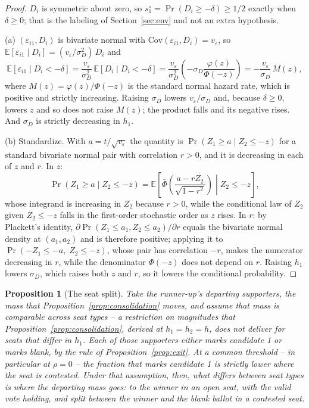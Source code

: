 \documentclass[11pt]{article}
\newtheorem{proposition}{Proposition}
\theoremstyle{definition}
\theoremstyle{remark}
\begin{document}
\begin{proof}
$D_i$ is symmetric about zero, so $s^\circ_1 = \Pr(D_i \ge -\delta) \ge 1/2$
exactly when $\delta \ge 0$; that is the labeling of Section~\ref{sec:env} and
not an extra hypothesis.

(a) $(\varepsilon_{i1}, D_i)$ is bivariate normal with
$\mathrm{Cov}(\varepsilon_{i1}, D_i) = v_\varepsilon$, so
$\mathbb{E}[\varepsilon_{i1} \mid D_i] = (v_\varepsilon/\sigma_D^2)\,D_i$ and
\[
  \mathbb{E}[\varepsilon_{i1} \mid D_i < -\delta]
  = \frac{v_\varepsilon}{\sigma_D^2}\,
    \mathbb{E}[D_i \mid D_i < -\delta]
  = \frac{v_\varepsilon}{\sigma_D^2}
    \left(-\sigma_D\frac{\varphi(z)}{\Phi(-z)}\right)
  = -\frac{v_\varepsilon}{\sigma_D}\,M(z),
\]
where $M(z) = \varphi(z)/\Phi(-z)$ is the standard normal hazard rate, which
is positive and strictly increasing. Raising $\sigma_D$ lowers
$v_\varepsilon/\sigma_D$ and, because $\delta \ge 0$, lowers $z$ and so does
not raise $M(z)$; the product falls and its negative rises. And $\sigma_D$ is
strictly decreasing in $h_1$.

(b) Standardize. With $a = t/\sqrt{v_\varepsilon}$ the quantity is
$\Pr(Z_1 \ge a \mid Z_2 \le -z)$ for a standard bivariate normal pair with
correlation $r > 0$, and it is decreasing in each of $z$ and $r$. In $z$:
\[
  \Pr(Z_1 \ge a \mid Z_2 \le -z)
  = \mathbb{E}\left[\left.\bar\Phi\!\left(\frac{a - rZ_2}{\sqrt{1-r^2}}\right)
    \;\right|\; Z_2 \le -z\right],
\]
whose integrand is increasing in $Z_2$ because $r > 0$, while the conditional
law of $Z_2$ given $Z_2 \le -z$ falls in the first-order stochastic order as
$z$ rises. In $r$: by Plackett's identity,
$\partial\Pr(Z_1 \le a_1, Z_2 \le a_2)/\partial r$ equals the bivariate normal
density at $(a_1,a_2)$ and is therefore positive; applying it to
$\Pr(-Z_1 \le -a,\; Z_2 \le -z)$, whose pair has correlation $-r$, makes the
numerator decreasing in $r$, while the denominator $\Phi(-z)$ does not depend
on $r$. Raising $h_1$ lowers $\sigma_D$, which raises both $z$ and $r$, so it
lowers the conditional probability.
\end{proof}

\begin{proposition}[The seat split]
\label{prop:seat}
Take the runner-up's departing supporters, the mass that
Proposition~\ref{prop:consolidation} moves, and \emph{assume} that mass is
comparable across seat types -- a restriction on magnitudes that
Proposition~\ref{prop:consolidation}, derived at $h_1 = h_2 = h$, does not
deliver for seats that differ in $h_1$. Each of those supporters either marks
candidate 1 or marks blank, by the rule of Proposition~\ref{prop:exit}. At a
common threshold -- in particular at $\rho = 0$ -- the fraction that marks
candidate 1 is strictly lower where the seat is contested. Under that
assumption, then, what differs between seat types is where the departing mass
goes: to the winner in an open seat, with the valid vote holding, and split
between the winner and the blank ballot in a contested seat.
\end{proposition}
\end{document}
